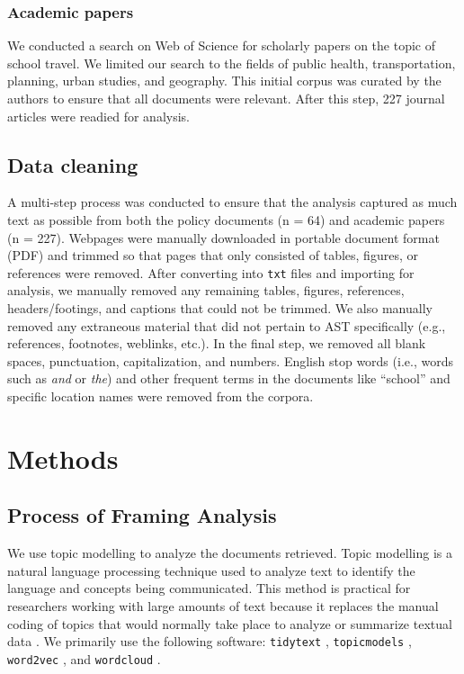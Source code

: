 \documentclass[preprint, 3p,
authoryear]{elsarticle} %
\begin{document}
\hypertarget{academic-papers}{%
\subsubsection{Academic papers}\label{academic-papers}}

We conducted a search on Web of Science for scholarly papers on the
topic of school travel. We limited our search to the fields of public
health, transportation, planning, urban studies, and geography. This
initial corpus was curated by the authors to ensure that all documents
were relevant. After this step, 227 journal articles were readied for
analysis.

\hypertarget{data-cleaning}{%
\subsection{Data cleaning}\label{data-cleaning}}

A multi-step process was conducted to ensure that the analysis captured
as much text as possible from both the policy documents (n = 64) and
academic papers (n = 227). Webpages were manually downloaded in portable
document format (PDF) and trimmed so that pages that only consisted of
tables, figures, or references were removed. After converting into
\texttt{txt} files and importing for analysis, we manually removed any
remaining tables, figures, references, headers/footings, and captions
that could not be trimmed. We also manually removed any extraneous
material that did not pertain to AST specifically (e.g., references,
footnotes, weblinks, etc.). In the final step, we removed all blank
spaces, punctuation, capitalization, and numbers. English stop words
(i.e., words such as \emph{and} or \emph{the}) and other frequent terms
in the documents like ``school'' and specific location names were
removed from the corpora.

\hypertarget{methods}{%
\section{Methods}\label{methods}}

\hypertarget{process-of-framing-analysis}{%
\subsection{Process of Framing
Analysis}\label{process-of-framing-analysis}}

We use topic modelling to analyze the documents retrieved. Topic
modelling is a natural language processing technique used to analyze
text to identify the language and concepts being communicated. This
method is practical for researchers working with large amounts of text
because it replaces the manual coding of topics that would normally take
place to analyze or summarize textual data
\citep{jacobiQuantitativeAnalysisLarge2016}. We primarily use the
following software: \texttt{tidytext} \citep{R-tidytext},
\texttt{topicmodels} \citep{R-topicmodels}, \texttt{word2vec}
\citep{R-word2vec}, and \texttt{wordcloud} \citep{R-wordcloud}.
\end{document}
